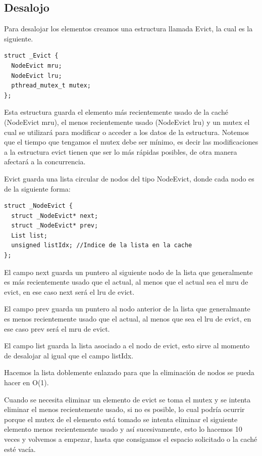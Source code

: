 \documentclass{article}
\begin{document}
\subsection{Desalojo}
Para desalojar los elementos creamos una estructura llamada
Evict, la cual es la siguiente.

\begin{lstlisting}[style=CStyle]
struct _Evict {  
  NodeEvict mru;
  NodeEvict lru;
  pthread_mutex_t mutex;  
};
\end{lstlisting}

Esta estructura guarda el elemento más recientemente
usado de la caché (NodeEvict mru), el menos
recientemente usado (NodeEvict lru) y un mutex el cual
se utilizará para modificar o acceder a los datos de
la estructura. Notemos que el tiempo que tengamos el
mutex debe ser mínimo, es decir las modificaciones a 
la estructura evict tienen que ser lo más rápidas
posibles, de otra manera afectará a la concurrencia.

Evict guarda una lista circular de nodos del tipo
NodeEvict, donde cada nodo es de la siguiente forma:

\begin{lstlisting}[style=CStyle]
struct _NodeEvict {
  struct _NodeEvict* next;
  struct _NodeEvict* prev;
  List list;
  unsigned listIdx; //Indice de la lista en la cache
};
\end{lstlisting}

El campo next guarda un puntero al siguiente nodo de
la lista que generalmente es más recientemente usado
que el actual, al menos que el actual sea el mru de
evict, en ese caso next será el lru de evict.

El campo prev guarda un puntero al nodo anterior de la
lista que generalmante es menos recientemente usado
que el actual, al menos que sea el lru de evict, en ese
caso prev será el mru de evict.

El campo list guarda la lista asociado a el nodo de
evict, esto sirve al momento de desalojar al igual
que el campo listIdx.

Hacemos la lista doblemente enlazado para que la
eliminación de nodos se pueda hacer en O(1).

Cuando se necesita eliminar un elemento de evict
se toma el mutex y se intenta eliminar el menos recientemente
usado, si no es posible, lo cual podría ocurrir porque
el mutex de el elemento está tomado se intenta eliminar el 
siguiente elemento menos recientemente usado y así sucesivamente,
esto lo hacemos 10 veces y volvemos a empezar, hasta que
consigamos el espacio solicitado o la caché esté vacía.
\end{document}
